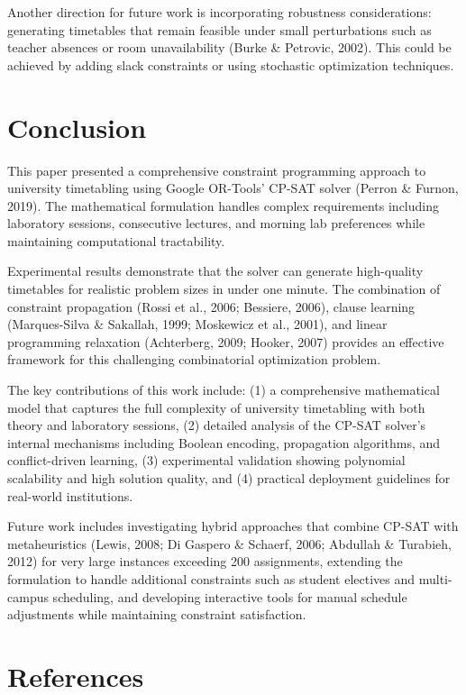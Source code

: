 \documentclass[12pt,a4paper]{article}
\begin{document}
Another direction for future work is incorporating robustness considerations: generating timetables that remain feasible under small perturbations such as teacher absences or room unavailability (Burke \& Petrovic, 2002). This could be achieved by adding slack constraints or using stochastic optimization techniques.

\section{Conclusion}

This paper presented a comprehensive constraint programming approach to university timetabling using Google OR-Tools' CP-SAT solver (Perron \& Furnon, 2019). The mathematical formulation handles complex requirements including laboratory sessions, consecutive lectures, and morning lab preferences while maintaining computational tractability.

Experimental results demonstrate that the solver can generate high-quality timetables for realistic problem sizes in under one minute. The combination of constraint propagation (Rossi et al., 2006; Bessiere, 2006), clause learning (Marques-Silva \& Sakallah, 1999; Moskewicz et al., 2001), and linear programming relaxation (Achterberg, 2009; Hooker, 2007) provides an effective framework for this challenging combinatorial optimization problem.

The key contributions of this work include: (1) a comprehensive mathematical model that captures the full complexity of university timetabling with both theory and laboratory sessions, (2) detailed analysis of the CP-SAT solver's internal mechanisms including Boolean encoding, propagation algorithms, and conflict-driven learning, (3) experimental validation showing polynomial scalability and high solution quality, and (4) practical deployment guidelines for real-world institutions.

Future work includes investigating hybrid approaches that combine CP-SAT with metaheuristics (Lewis, 2008; Di Gaspero \& Schaerf, 2006; Abdullah \& Turabieh, 2012) for very large instances exceeding 200 assignments, extending the formulation to handle additional constraints such as student electives and multi-campus scheduling, and developing interactive tools for manual schedule adjustments while maintaining constraint satisfaction.

\section{References}
\end{document}
